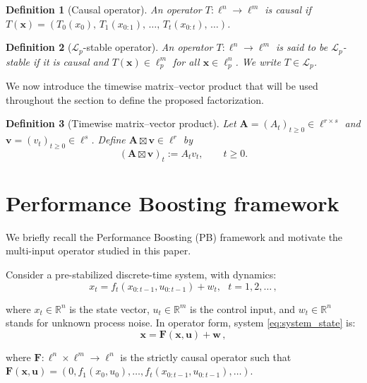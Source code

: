 \documentclass[journal,twoside,web]{ieeecolor}
\newtheorem{definition}{Definition}
\begin{document}
\begin{definition}[Causal operator]
An operator $T:\ell^n\to \ell^m$ is causal if
$T(\mathbf{x}) = (T_0(x_0),\,T_1(x_{0:1}),\,\dots,\,T_t(x_{0:t}),\,\dots)$.
\end{definition}

\begin{definition}[$\mathcal L_p$-stable operator]
An operator $T:\ell^n\to \ell^m$ is said to be $\mathcal L_p$-stable if it is causal and
$T(\mathbf{x})\in \ell_p^m$ for all $\mathbf{x}\in \ell_p^n$. We write $T\in\mathcal L_p$.
\end{definition}
We now introduce the timewise matrix--vector product that will be used throughout the section to
define the proposed factorization.
\begin{definition}[Timewise matrix--vector product]\label{def:timewise-product}
Let $\mathbf{A}=(A_t)_{t\ge 0}\in \ell^{r\times s}$ and $\mathbf{v}=(v_t)_{t\ge 0}\in \ell^{s}$.
Define $\mathbf{A}\boxtimes \mathbf{v}\in \ell^{r}$ by
\[
(\mathbf{A}\boxtimes \mathbf{v})_t := A_t v_t,\qquad t\ge 0.
\]
\end{definition}



\section{Performance Boosting framework}
\label{sec:pb}

We briefly recall the Performance Boosting (PB) framework and motivate the multi-input operator
studied in this paper.

Consider a pre-stabilized discrete-time system, with dynamics: 
\begin{equation}\label{eq:system_state}
    x_t = f_t(x_{0:t-1},u_{0:t-1})+ w_t, ~~~t= 1,2,\ldots\,,
\end{equation}

where $x_t \in \mathbb{R}^n$ is the state vector, $u_t \in \mathbb{R}^m$ is the control input, and $w_t \in \mathbb{R}^n$ stands for unknown process noise. In operator form, system \ref{eq:system_state} is: 
\begin{equation}
\label{eq:operator_form_state}
    \boldsymbol{x} = \mathbf{F}(\boldsymbol{x},\mathbf{u}) + \mathbf{w}\,,
\end{equation}

where $\mathbf{F}:\ell^n\times \ell^m \rightarrow \ell^n$ is the strictly causal operator such that $\mathbf{F}(\mathbf{x},\mathbf{u}) = (0,f_1(x_0,u_0),\ldots,f_t(x_{0:t-1},u_{0:t-1}),\ldots)$.
\end{document}
